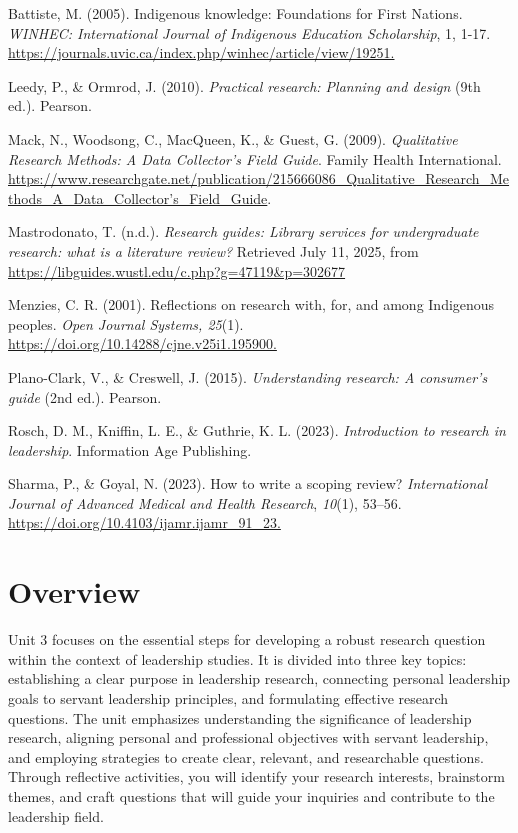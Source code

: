 \documentclass[
  letterpaper,
  DIV=11,
  numbers=noendperiod]{scrreprt}
\begin{document}
Battiste, M. (2005). Indigenous knowledge: Foundations for First
Nations. \emph{WINHEC: International Journal of Indigenous Education
Scholarship}, 1, 1-17.
\url{https://journals.uvic.ca/index.php/winhec/article/view/19251.}

Leedy, P., \& Ormrod, J. (2010). \emph{Practical research: Planning and
design} (9th ed.). Pearson.

Mack, N., Woodsong, C., MacQueen, K., \& Guest, G. (2009).
\emph{Qualitative Research Methods: A Data Collector's Field Guide}.
Family Health International.
\url{https://www.researchgate.net/publication/215666086_Qualitative_Research_Methods_A_Data_Collector’s_Field_Guide}.

Mastrodonato, T. (n.d.). \emph{Research guides: Library services for
undergraduate research: what is a literature review?} Retrieved July 11,
2025, from \url{https://libguides.wustl.edu/c.php?g=47119&p=302677}

Menzies, C. R. (2001). Reflections on research with, for, and among
Indigenous peoples. \emph{Open Journal Systems, 25}(1).
\url{https://doi.org/10.14288/cjne.v25i1.195900.}

Plano-Clark, V., \& Creswell, J. (2015). \emph{Understanding research: A
consumer's guide} (2nd ed.). Pearson.

Rosch, D. M., Kniffin, L. E., \& Guthrie, K. L. (2023).
\emph{Introduction to research in leadership}. Information Age
Publishing.

Sharma, P., \& Goyal, N. (2023). How to write a scoping review?
\emph{International Journal of Advanced Medical and Health Research},
\emph{10}(1), 53--56. \url{https://doi.org/10.4103/ijamr.ijamr_91_23.}


\chapter*{Overview}\label{overview-2}


Unit 3 focuses on the essential steps for developing a robust research
question within the context of leadership studies. It is divided into
three key topics: establishing a clear purpose in leadership research,
connecting personal leadership goals to servant leadership principles,
and formulating effective research questions. The unit emphasizes
understanding the significance of leadership research, aligning personal
and professional objectives with servant leadership, and employing
strategies to create clear, relevant, and researchable questions.
Through reflective activities, you will identify your research
interests, brainstorm themes, and craft questions that will guide your
inquiries and contribute to the leadership field.
\end{document}
